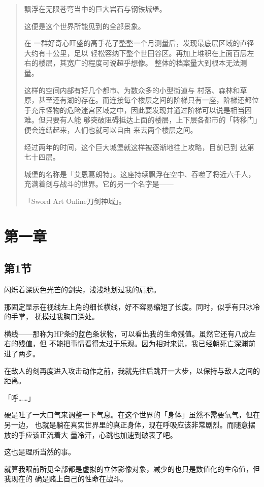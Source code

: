 \documentclass[11pt]{book}
\begin{document}
\begin{quote}
飘浮在无限苍穹当中的巨大岩石与钢铁城堡。

这便是这个世界所能见到的全部景象。

在
一群好奇心旺盛的高手花了整整一个月测量后，发现最底层区域的直径大约有十公里，足以
轻松容纳下整个世田谷区。再加上堆积在上面百层左右的楼层，其宽广的程度可说超乎想像。
整体的档案量大到根本无法测量。

这样的空间内部有好几个都市、为数众多的小型街道与
村落、森林和草原，甚至还有湖的存在。而连接每个楼层之间的阶梯只有一座，阶梯还都位
于充斥怪物的危险迷宫区域之中，因此要发现并通过阶梯可以说是相当困难。但只要有人能
够突破阻碍抵达上面的楼层，上下层各都市的「转移门」便会连结起来，人们也就可以自由
来去两个楼层之间。

经过两年的时间，这个巨大城堡就这样被逐渐地往上攻略，目前已到
达第七十四层。

城堡的名称是「艾恩葛朗特」。这座持续飘浮在空中、吞噬了将近六千人，
充满着剑与战斗的世界。它的另一个名字是——

「Sword Art Online刀剑神域」。
\end{quote}

\chapter{第一章}
\label{sec:org726aa7b}
\section{第1节}
\label{sec:orgad53d9a}
闪烁着深灰色光芒的剑尖，浅浅地划过我的肩膀。

那固定显示在视线左上角的细长横线，好不容易缩短了长度。同时，似乎有只冰冷的手掌，
抚摸过我胸口深处。

横线——那称为HP条的蓝色条状物，可以看出我的生命残值。虽然它还有八成左右的残值，但
不能把事情看得太过于乐观。因为相对来说，我已经朝死亡深渊前进了两步。

在敌人的剑再度进入攻击动作之前，我就先往后跳开一大步，以保持与敌人之间的距离。

「呼……」

硬是吐了一大口气来调整一下气息。在这个世界的「身体」虽然不需要氧气，但在另一边，
也就是躺在真实世界里的真正身体，现在呼吸应该非常剧烈。而随意摆放的手应该正流着大
量冷汗，心跳也加速到破表了吧。

这也是理所当然的事。

就算我眼前所见全部都是虚拟的立体影像对象，减少的也只是数值化的生命值，但我现在的
确是赌上自己的性命在战斗。
\end{document}
